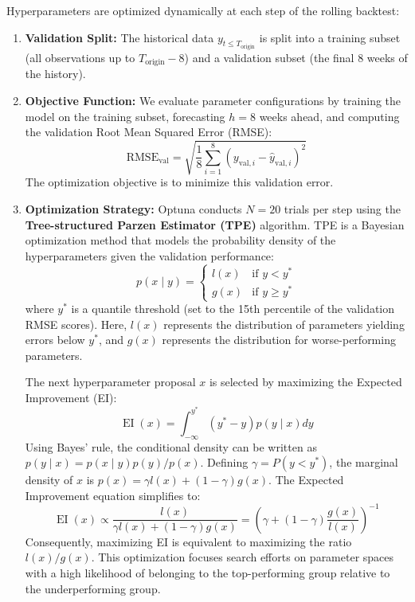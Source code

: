 Hyperparameters are optimized dynamically at each step of the rolling backtest:
\begin{enumerate}
    \item \textbf{Validation Split:} The historical data $y_{t \le T_{\text{origin}}}$ is split into a training subset (all observations up to $T_{\text{origin}} - 8$) and a validation subset (the final 8 weeks of the history).
    \item \textbf{Objective Function:} We evaluate parameter configurations by training the model on the training subset, forecasting $h=8$ weeks ahead, and computing the validation Root Mean Squared Error (RMSE):
    \begin{equation}
    \text{RMSE}_{\text{val}} = \sqrt{\frac{1}{8}\sum_{i=1}^8 (y_{\text{val}, i} - \hat{y}_{\text{val}, i})^2}
    \end{equation}
    The optimization objective is to minimize this validation error.
    \item \textbf{Optimization Strategy:} Optuna conducts $N=20$ trials per step using the \textbf{Tree-structured Parzen Estimator (TPE)} algorithm. TPE is a Bayesian optimization method that models the probability density of the hyperparameters given the validation performance:
    \begin{equation}
    p(x \mid y) = \begin{cases} 
    l(x) & \text{if } y < y^* \\
    g(x) & \text{if } y \ge y^*
    \end{cases}
    \end{equation}
    where $y^*$ is a quantile threshold (set to the 15th percentile of the validation RMSE scores). Here, $l(x)$ represents the distribution of parameters yielding errors below $y^*$, and $g(x)$ represents the distribution for worse-performing parameters.
    
    The next hyperparameter proposal $x$ is selected by maximizing the Expected Improvement (EI):
    \begin{equation}
    \operatorname{EI}(x) = \int_{-\infty}^{y^*} (y^* - y) p(y \mid x) dy
    \end{equation}
    Using Bayes' rule, the conditional density can be written as $p(y \mid x) = p(x \mid y) p(y) / p(x)$. Defining $\gamma = P(y < y^*)$, the marginal density of $x$ is $p(x) = \gamma l(x) + (1 - \gamma) g(x)$. The Expected Improvement equation simplifies to:
    \begin{equation}
    \operatorname{EI}(x) \propto \frac{l(x)}{\gamma l(x) + (1-\gamma)g(x)} = \left( \gamma + (1-\gamma)\frac{g(x)}{l(x)} \right)^{-1}
    \end{equation}
    Consequently, maximizing EI is equivalent to maximizing the ratio $l(x)/g(x)$. This optimization focuses search efforts on parameter spaces with a high likelihood of belonging to the top-performing group relative to the underperforming group.
    

\end{enumerate}

